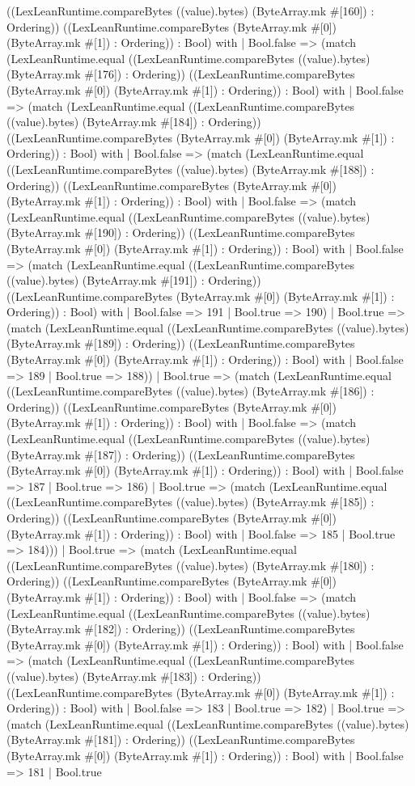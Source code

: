 \documentclass[11pt]{article}
\begin{document}
((LexLeanRuntime.compareBytes ((value).bytes) (ByteArray.mk \#[160]) : Ordering)) ((LexLeanRuntime.compareBytes (ByteArray.mk \#[0]) (ByteArray.mk \#[1]) : Ordering)) : Bool) with | Bool.false => (match (LexLeanRuntime.equal ((LexLeanRuntime.compareBytes ((value).bytes) (ByteArray.mk \#[176]) : Ordering)) ((LexLeanRuntime.compareBytes (ByteArray.mk \#[0]) (ByteArray.mk \#[1]) : Ordering)) : Bool) with | Bool.false => (match (LexLeanRuntime.equal ((LexLeanRuntime.compareBytes ((value).bytes) (ByteArray.mk \#[184]) : Ordering)) ((LexLeanRuntime.compareBytes (ByteArray.mk \#[0]) (ByteArray.mk \#[1]) : Ordering)) : Bool) with | Bool.false => (match (LexLeanRuntime.equal ((LexLeanRuntime.compareBytes ((value).bytes) (ByteArray.mk \#[188]) : Ordering)) ((LexLeanRuntime.compareBytes (ByteArray.mk \#[0]) (ByteArray.mk \#[1]) : Ordering)) : Bool) with | Bool.false => (match (LexLeanRuntime.equal ((LexLeanRuntime.compareBytes ((value).bytes) (ByteArray.mk \#[190]) : Ordering)) ((LexLeanRuntime.compareBytes (ByteArray.mk \#[0]) (ByteArray.mk \#[1]) : Ordering)) : Bool) with | Bool.false => (match (LexLeanRuntime.equal ((LexLeanRuntime.compareBytes ((value).bytes) (ByteArray.mk \#[191]) : Ordering)) ((LexLeanRuntime.compareBytes (ByteArray.mk \#[0]) (ByteArray.mk \#[1]) : Ordering)) : Bool) with | Bool.false => 191 | Bool.true => 190) | Bool.true => (match (LexLeanRuntime.equal ((LexLeanRuntime.compareBytes ((value).bytes) (ByteArray.mk \#[189]) : Ordering)) ((LexLeanRuntime.compareBytes (ByteArray.mk \#[0]) (ByteArray.mk \#[1]) : Ordering)) : Bool) with | Bool.false => 189 | Bool.true => 188)) | Bool.true => (match (LexLeanRuntime.equal ((LexLeanRuntime.compareBytes ((value).bytes) (ByteArray.mk \#[186]) : Ordering)) ((LexLeanRuntime.compareBytes (ByteArray.mk \#[0]) (ByteArray.mk \#[1]) : Ordering)) : Bool) with | Bool.false => (match (LexLeanRuntime.equal ((LexLeanRuntime.compareBytes ((value).bytes) (ByteArray.mk \#[187]) : Ordering)) ((LexLeanRuntime.compareBytes (ByteArray.mk \#[0]) (ByteArray.mk \#[1]) : Ordering)) : Bool) with | Bool.false => 187 | Bool.true => 186) | Bool.true => (match (LexLeanRuntime.equal ((LexLeanRuntime.compareBytes ((value).bytes) (ByteArray.mk \#[185]) : Ordering)) ((LexLeanRuntime.compareBytes (ByteArray.mk \#[0]) (ByteArray.mk \#[1]) : Ordering)) : Bool) with | Bool.false => 185 | Bool.true => 184))) | Bool.true => (match (LexLeanRuntime.equal ((LexLeanRuntime.compareBytes ((value).bytes) (ByteArray.mk \#[180]) : Ordering)) ((LexLeanRuntime.compareBytes (ByteArray.mk \#[0]) (ByteArray.mk \#[1]) : Ordering)) : Bool) with | Bool.false => (match (LexLeanRuntime.equal ((LexLeanRuntime.compareBytes ((value).bytes) (ByteArray.mk \#[182]) : Ordering)) ((LexLeanRuntime.compareBytes (ByteArray.mk \#[0]) (ByteArray.mk \#[1]) : Ordering)) : Bool) with | Bool.false => (match (LexLeanRuntime.equal ((LexLeanRuntime.compareBytes ((value).bytes) (ByteArray.mk \#[183]) : Ordering)) ((LexLeanRuntime.compareBytes (ByteArray.mk \#[0]) (ByteArray.mk \#[1]) : Ordering)) : Bool) with | Bool.false => 183 | Bool.true => 182) | Bool.true => (match (LexLeanRuntime.equal ((LexLeanRuntime.compareBytes ((value).bytes) (ByteArray.mk \#[181]) : Ordering)) ((LexLeanRuntime.compareBytes (ByteArray.mk \#[0]) (ByteArray.mk \#[1]) : Ordering)) : Bool) with | Bool.false => 181 | Bool.true 
\end{document}
